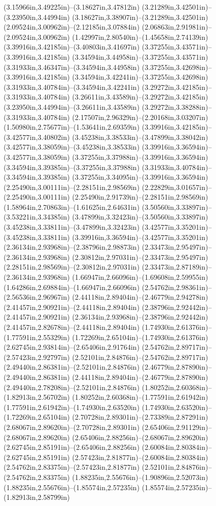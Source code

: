 (3.15966in,3.49225in)--(3.18627in,3.47812in) (3.21289in,3.42501in)--(3.23950in,3.44994in) (3.18627in,3.38907in)--(3.21289in,3.42501in) (2.09524in,3.00962in)--(2.12185in,3.07884in) (2.06863in,2.91981in)--(2.09524in,3.00962in) (1.42997in,2.80540in)--(1.45658in,2.74139in) (3.39916in,3.42185in)--(3.40803in,3.41697in) (3.37255in,3.43571in)--(3.39916in,3.42185in) (3.34594in,3.44958in)--(3.37255in,3.43571in) (3.31933in,3.46347in)--(3.34594in,3.44958in) (3.37255in,3.42698in)--(3.39916in,3.42185in) (3.34594in,3.42241in)--(3.37255in,3.42698in) (3.31933in,3.40784in)--(3.34594in,3.42241in) (3.29272in,3.42185in)--(3.31933in,3.40784in) (3.26611in,3.43589in)--(3.29272in,3.42185in) (3.23950in,3.44994in)--(3.26611in,3.43589in) (3.29272in,3.38288in)--(3.31933in,3.40784in) (2.17507in,2.96329in)--(2.20168in,3.03207in) (1.50980in,2.75677in)--(1.53641in,2.69359in) (3.39916in,3.42185in)--(3.42577in,3.40802in) (3.45238in,3.38533in)--(3.47899in,3.38042in) (3.42577in,3.38059in)--(3.45238in,3.38533in) (3.39916in,3.36594in)--(3.42577in,3.38059in) (3.37255in,3.37988in)--(3.39916in,3.36594in) (3.34594in,3.39385in)--(3.37255in,3.37988in) (3.31933in,3.40784in)--(3.34594in,3.39385in) (3.37255in,3.34095in)--(3.39916in,3.36594in) (2.25490in,3.00111in)--(2.28151in,2.98569in) (2.22829in,3.01657in)--(2.25490in,3.00111in) (2.25490in,2.91739in)--(2.28151in,2.98569in) (1.58964in,2.70863in)--(1.61625in,2.64631in) (3.50560in,3.33897in)--(3.53221in,3.34385in) (3.47899in,3.32423in)--(3.50560in,3.33897in) (3.45238in,3.33811in)--(3.47899in,3.32423in) (3.42577in,3.35201in)--(3.45238in,3.33811in) (3.39916in,3.36594in)--(3.42577in,3.35201in) (2.36134in,2.93968in)--(2.38796in,2.98873in) (2.33473in,2.95497in)--(2.36134in,2.93968in) (2.30812in,2.97031in)--(2.33473in,2.95497in) (2.28151in,2.98569in)--(2.30812in,2.97031in) (2.33473in,2.87189in)--(2.36134in,2.93968in) (1.66947in,2.66096in)--(1.69608in,2.59955in) (1.64286in,2.69884in)--(1.66947in,2.66096in) (2.54762in,2.98361in)--(2.56536in,2.96967in) (2.44118in,2.89404in)--(2.46779in,2.94278in) (2.41457in,2.90921in)--(2.44118in,2.89404in) (2.38796in,2.92442in)--(2.41457in,2.90921in) (2.36134in,2.93968in)--(2.38796in,2.92442in) (2.41457in,2.82678in)--(2.44118in,2.89404in) (1.74930in,2.61376in)--(1.77591in,2.55329in) (1.72269in,2.65104in)--(1.74930in,2.61376in) (2.62745in,2.93814in)--(2.65406in,2.91764in) (2.54762in,2.89717in)--(2.57423in,2.92797in) (2.52101in,2.84876in)--(2.54762in,2.89717in) (2.49440in,2.86381in)--(2.52101in,2.84876in) (2.46779in,2.87890in)--(2.49440in,2.86381in) (2.44118in,2.89404in)--(2.46779in,2.87890in) (2.49440in,2.78208in)--(2.52101in,2.84876in) (1.80252in,2.60368in)--(1.82913in,2.56702in) (1.80252in,2.60368in)--(1.77591in,2.61942in) (1.77591in,2.61942in)--(1.74930in,2.63520in) (1.74930in,2.63520in)--(1.72269in,2.65104in) (2.70728in,2.89301in)--(2.73389in,2.87291in) (2.68067in,2.89620in)--(2.70728in,2.89301in) (2.65406in,2.91129in)--(2.68067in,2.89620in) (2.65406in,2.88256in)--(2.68067in,2.89620in) (2.62745in,2.85191in)--(2.65406in,2.88256in) (2.60084in,2.80384in)--(2.62745in,2.85191in) (2.57423in,2.81877in)--(2.60084in,2.80384in) (2.54762in,2.83375in)--(2.57423in,2.81877in) (2.52101in,2.84876in)--(2.54762in,2.83375in) (1.88235in,2.55676in)--(1.90896in,2.52073in) (1.88235in,2.55676in)--(1.85574in,2.57235in) (1.85574in,2.57235in)--(1.82913in,2.58799in) 